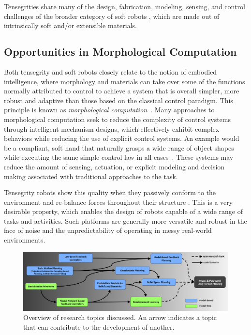Tensegrities share many of the design, fabrication, modeling, sensing,
and control challenges of the broader category of soft robots
\cite{Pfeifer:2012aa, Kim:2013aa, Majidi:2014aa},
which are made out of intrinsically soft and/or extensible
materials. 

\subsection{Opportunities in Morphological Computation}


Both tensegrity and soft robots closely relate to the notion of
embodied intelligence, where morphology and materials can take over
some of the functions normally attributed to control to achieve a
system that is overall simpler, more robust and adaptive than those
based on the classical control paradigm. This principle
is known as \emph{morphological computation}~\cite{Pfeifer:2012aa,
Hauser}.  Many approaches to morphological
computation \cite{Zambrano:2014aa, Hauser} seek to reduce the
complexity of control systems through intelligent mechanism designs,
which effectively exhibit complex behaviors while reducing the use of
explicit control systems.  An example would be a compliant, soft hand
that naturally grasps a wide range of object shapes while executing
the same simple control law in all cases~\cite{Deimel:2015aa}.  These
systems may reduce the amount of sensing, actuation, or explicit
modeling and decision making associated with traditional approaches to
the task.

Tensegrity robots show this quality when they passively conform to the
environment and re-balance forces throughout their
structure \cite{Khazanov:2014aa}.  This is a very desirable property,
which enables the design of robots capable of a wide range of tasks
and activities. Such platforms are generally more versatile and robust
in the face of noise and the unpredictability of operating in messy
real-world environments.


\begin{figure}[t]
\includegraphics[width = \textwidth]{tex/img/review_overview_fig}
\caption{Overview of research topics discussed. An arrow indicates a topic that can contribute to the
development of another.  }
\label{fig:overview}
\end{figure}

